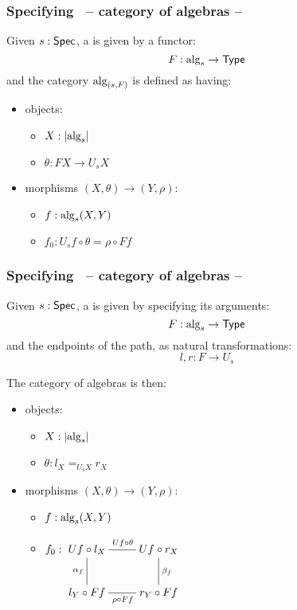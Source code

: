 \documentclass{beamer}
\begin{document}
\begin{frame}
  \frametitle{Specifying \onehits\ -- category of algebras -- \zeroconstructors}
  
  Given $s : \mathsf{Spec}$, a \zeroconstructor is given by a functor:
  $$
  F : \mbox{alg}_{s} \to \mathsf{Type}
  $$
  and the category $\mbox{alg}_{(s,F)}$ is defined as having:
  \begin{itemize}
  \item objects: 
    \begin{itemize}
    \item $X : | \mbox{alg}_{s} |$
    \item $\theta : FX \to U_s X$
    \end{itemize}
  \item morphisms $(X,\theta) \to (Y,\rho)$:
    \begin{itemize}
    \item $f : \mbox{alg}_{s}(X,Y)$
    \item $f_0 : U_s f \circ \theta = \rho \circ F f$
    \end{itemize}
  \end{itemize}
\end{frame}

\begin{frame}
  \frametitle{Specifying \onehits\ -- category of algebras -- \oneconstructors}
  
  Given $s : \mathsf{Spec}$, a \oneconstructor is given by specifying its arguments:
  $$
  F : \mbox{alg}_{s} \to \mathsf{Type}
  $$
  and the endpoints of the path, as natural transformations:
  $$
  l, r : F \to U_s
  $$

  The category of algebras is then:
  \begin{itemize}
  \item objects:
    \begin{itemize}
    \item $X : | \mbox{alg}_{s} |$
    \item $\theta : l_X =_{U_s X} r_X$
    \end{itemize}
  \item morphisms $(X,\theta) \to (Y,\rho)$:
    \begin{itemize}
    \item $f : \mbox{alg}_{s}(X,Y)$
    \item $f_0 : \xymatrix{
        Uf \circ l_X
        \ar@{-}[r]^{Uf \circ \theta}
        \ar@{-}[d]_{\alpha_f}
        &Uf \circ r_X
        \ar@{-}[d]^{\beta_f}
        \\
        l_Y \circ Ff 
        \ar@{-}[r]_{\rho \circ Ff}
        &r_Y \circ Ff
      }$
    \end{itemize}
  \end{itemize}
\end{frame}
\end{document}
